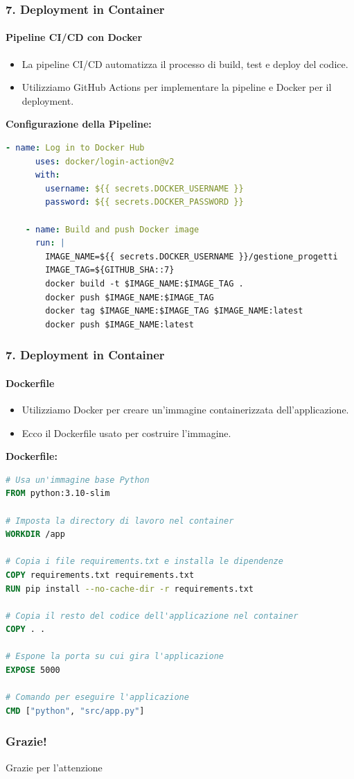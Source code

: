 \documentclass{beamer}
\begin{document}
\begin{frame}[fragile]
\frametitle{7. Deployment in Container}
\framesubtitle{Pipeline CI/CD con Docker}

\begin{itemize}
\item La pipeline CI/CD automatizza il processo di build, test e deploy del codice.
\item Utilizziamo GitHub Actions per implementare la pipeline e Docker per il deployment.
\end{itemize}

\textbf{Configurazione della Pipeline:}
\begin{lstlisting}[language=yaml, basicstyle=\tiny]
    - name: Log in to Docker Hub
      uses: docker/login-action@v2
      with:
        username: ${{ secrets.DOCKER_USERNAME }}
        password: ${{ secrets.DOCKER_PASSWORD }}

    - name: Build and push Docker image
      run: |
        IMAGE_NAME=${{ secrets.DOCKER_USERNAME }}/gestione_progetti
        IMAGE_TAG=${GITHUB_SHA::7}
        docker build -t $IMAGE_NAME:$IMAGE_TAG .
        docker push $IMAGE_NAME:$IMAGE_TAG
        docker tag $IMAGE_NAME:$IMAGE_TAG $IMAGE_NAME:latest
        docker push $IMAGE_NAME:latest
\end{lstlisting}
\end{frame}

\begin{frame}[fragile]
\frametitle{7. Deployment in Container}
\framesubtitle{Dockerfile}

\begin{itemize}
\item Utilizziamo Docker per creare un'immagine containerizzata dell'applicazione.
\item Ecco il Dockerfile usato per costruire l'immagine.
\end{itemize}

\textbf{Dockerfile:}
\begin{lstlisting}[language=Dockerfile, basicstyle=\tiny]
# Usa un'immagine base Python
FROM python:3.10-slim

# Imposta la directory di lavoro nel container
WORKDIR /app

# Copia i file requirements.txt e installa le dipendenze
COPY requirements.txt requirements.txt
RUN pip install --no-cache-dir -r requirements.txt

# Copia il resto del codice dell'applicazione nel container
COPY . .

# Espone la porta su cui gira l'applicazione
EXPOSE 5000

# Comando per eseguire l'applicazione
CMD ["python", "src/app.py"]
\end{lstlisting}
\end{frame}


\begin{frame}
\frametitle{Grazie!}
\centering
Grazie per l'attenzione
\end{frame}
\end{document}
